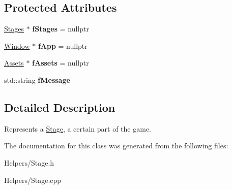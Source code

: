 \subsection*{Protected Attributes}
\begin{DoxyCompactItemize}
\item 
\hypertarget{classty_s_f_m_l_1_1_stage_aeb2c377d8ca9d7815b30ef332e6058f4}{}\hyperlink{structty_s_f_m_l_1_1_stages}{Stages} $\ast$ {\bfseries f\+Stages} = nullptr\label{classty_s_f_m_l_1_1_stage_aeb2c377d8ca9d7815b30ef332e6058f4}

\item 
\hypertarget{classty_s_f_m_l_1_1_stage_aaa1fe2088060bdea804dc94c4d7cb22c}{}\hyperlink{classty_s_f_m_l_1_1_window}{Window} $\ast$ {\bfseries f\+App} = nullptr\label{classty_s_f_m_l_1_1_stage_aaa1fe2088060bdea804dc94c4d7cb22c}

\item 
\hypertarget{classty_s_f_m_l_1_1_stage_a828ef12ca723c30951580debb77d4cac}{}\hyperlink{classty_s_f_m_l_1_1_assets}{Assets} $\ast$ {\bfseries f\+Assets} = nullptr\label{classty_s_f_m_l_1_1_stage_a828ef12ca723c30951580debb77d4cac}

\item 
\hypertarget{classty_s_f_m_l_1_1_stage_a4ee5a9886be492f67c97805a33bdd1d6}{}std\+::string {\bfseries f\+Message}\label{classty_s_f_m_l_1_1_stage_a4ee5a9886be492f67c97805a33bdd1d6}

\end{DoxyCompactItemize}


\subsection{Detailed Description}
Represents a \hyperlink{classty_s_f_m_l_1_1_stage}{Stage}, a certain part of the game. 

The documentation for this class was generated from the following files\+:\begin{DoxyCompactItemize}
\item 
Helpers/Stage.\+h\item 
Helpers/Stage.\+cpp\end{DoxyCompactItemize}
